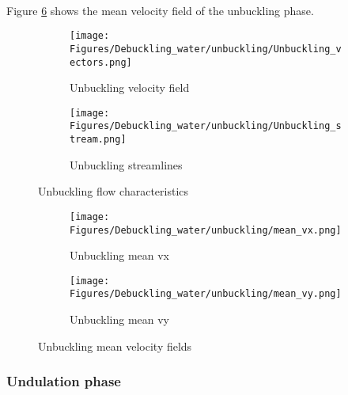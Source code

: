 \documentclass[a4paper,10pt]{report}
\begin{document}
\paragraph{}
Figure \ref{fig:Unbucklingmeanvelocityfields} shows the mean velocity field of the unbuckling phase.
\begin{figure}[htbp]%
	\centering%
	 \begin{subfigure}[h]{0.5\textwidth}%
        \texttt{[image: Figures/Debuckling\_water/unbuckling/Unbuckling\_vectors.png]}%
        \caption{Unbuckling velocity field}%
				\label{fig:UnbucklingVelocityField}%
    \end{subfigure}%
    \begin{subfigure}[h]{0.5\textwidth}%
        \texttt{[image: Figures/Debuckling\_water/unbuckling/Unbuckling\_stream.png]}%
        \caption{Unbuckling streamlines}%
        \label{fig:Unbucklingstreamlines}%
    \end{subfigure}%
		\caption{Unbuckling flow characteristics}%
		\label{fig:Unbucklingflowcharacteristics}%
\end{figure}
\begin{figure}[htbp]%
	\centering%
	 \begin{subfigure}[h]{0.5\textwidth}%
        \texttt{[image: Figures/Debuckling\_water/unbuckling/mean\_vx.png]}%
        \caption{Unbuckling mean vx}%
				\label{fig:UnbucklingVelocityField}%
    \end{subfigure}%
    \begin{subfigure}[h]{0.5\textwidth}%
        \texttt{[image: Figures/Debuckling\_water/unbuckling/mean\_vy.png]}%
        \caption{Unbuckling mean vy}%
        \label{fig:Unbucklingstreamlines}%
    \end{subfigure}%
		\caption{Unbuckling mean velocity fields}%
		\label{fig:Unbucklingmeanvelocityfields}%
\end{figure}
\newpage
\subsubsection{Undulation phase}
\end{document}
